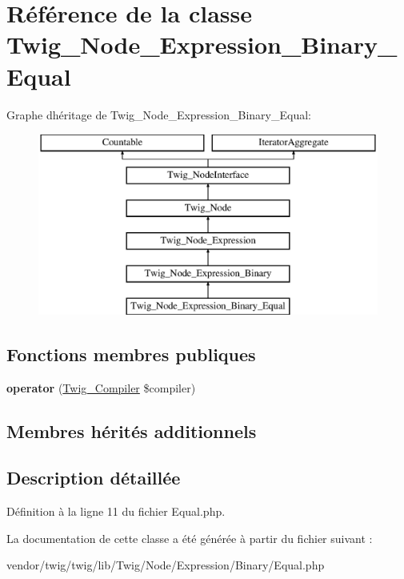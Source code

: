 \hypertarget{class_twig___node___expression___binary___equal}{}\section{Référence de la classe Twig\+\_\+\+Node\+\_\+\+Expression\+\_\+\+Binary\+\_\+\+Equal}
\label{class_twig___node___expression___binary___equal}
Graphe d\textquotesingle{}héritage de Twig\+\_\+\+Node\+\_\+\+Expression\+\_\+\+Binary\+\_\+\+Equal\+:\begin{figure}[H]
\begin{center}
\leavevmode
\includegraphics[height=6.000000cm]{class_twig___node___expression___binary___equal}
\end{center}
\end{figure}
\subsection*{Fonctions membres publiques}
\begin{DoxyCompactItemize}
\item 
{\bfseries operator} (\hyperlink{class_twig___compiler}{Twig\+\_\+\+Compiler} \$compiler)\hypertarget{class_twig___node___expression___binary___equal_af77318ec88d5f8a508684970a150b670}{}\label{class_twig___node___expression___binary___equal_af77318ec88d5f8a508684970a150b670}

\end{DoxyCompactItemize}
\subsection*{Membres hérités additionnels}


\subsection{Description détaillée}


Définition à la ligne 11 du fichier Equal.\+php.



La documentation de cette classe a été générée à partir du fichier suivant \+:\begin{DoxyCompactItemize}
\item 
vendor/twig/twig/lib/\+Twig/\+Node/\+Expression/\+Binary/Equal.\+php\end{DoxyCompactItemize}
